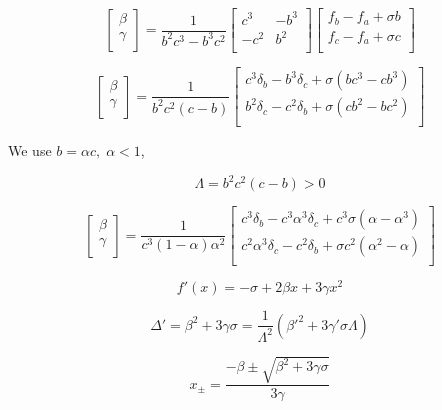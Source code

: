 \documentclass[aps,12pt]{revtex4}
\begin{document}
\begin{equation}
	\begin{bmatrix}
	\beta\\
	\gamma\\
\end{bmatrix}
= \dfrac{1}{b^2c^3-b^3c^2} 
\begin{bmatrix}
	c^3 & -b^3 \\
	-c^2 & b^2 \\
\end{bmatrix}
\begin{bmatrix}
	f_b - f_a + \sigma b\\
	f_c - f_a + \sigma c\\
\end{bmatrix}
\end{equation}


\begin{equation}
	\begin{bmatrix}
	\beta\\
	\gamma\\
\end{bmatrix}
= \dfrac{1}{b^2c^2(c-b)} 
\begin{bmatrix}
	c^3 \delta_b -  b^3 \delta_c + \sigma (bc^3-cb^3)\\
	b^2 \delta_c - c^2 \delta_b + \sigma (cb^2 - b c ^2)\\
\end{bmatrix}
\end{equation}

We use $b=\alpha c,\;\alpha<1$,

\begin{equation}
	\Lambda = b^2c^2(c-b) > 0
\end{equation}

	\begin{equation}
	\begin{bmatrix}
	\beta\\
	\gamma\\
\end{bmatrix}
= \dfrac{1}{c^3(1-\alpha)\alpha^2} 
\begin{bmatrix}
	c^3 \delta_b -  c^3 \alpha^3 \delta_c + c^3 \sigma (\alpha-\alpha^3)\\
	c^2 \alpha^3 \delta_c - c^2 \delta_b + \sigma c^2 (\alpha^2 - \alpha)\\
\end{bmatrix}
\end{equation}


\begin{equation}
	f'(x) = -\sigma + 2 \beta x + 3 \gamma x^2
\end{equation}

\begin{equation}
	\Delta' = \beta^2 + 3\gamma\sigma = \dfrac{1}{\Lambda^2} \left( \beta'^2 + 3 \gamma' \sigma \Lambda \right)
\end{equation}

\begin{equation}
	x_\pm = \dfrac{-\beta \pm \sqrt{\beta^2 + 3\gamma\sigma}}{3\gamma}
\end{equation}
\end{document}
